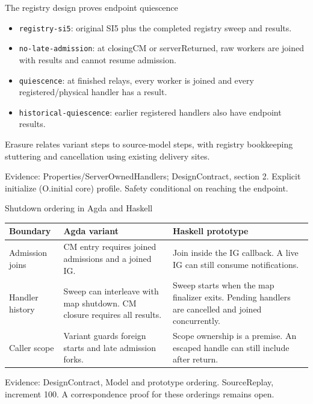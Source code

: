 \documentclass[11pt,aspectratio=169]{beamer}
\newcommand{\evidence}[1]{\vfill{\fontsize{7}{8}\selectfont\color{Muted}Evidence: #1\par}}
\begin{document}
\begin{frame}{The registry design proves endpoint quiescence}
\begin{itemize}\setlength\itemsep{2.5mm}
\item \texttt{registry-si5}: original SI5 plus the completed registry sweep and results.
\item \texttt{no-late-admission}: at closingCM or serverReturned, raw workers are joined with results and cannot resume admission.
\item \texttt{quiescence}: at finished relays, every worker is joined and every registered/physical handler has a result.
\item \texttt{historical-quiescence}: earlier registered handlers also have endpoint results.
\end{itemize}\small Erasure relates variant steps to source-model steps, with registry bookkeeping stuttering and cancellation using existing delivery sites.
\evidence{Properties/ServerOwnedHandlers; DesignContract, section 2. Explicit initialize (O.initial core) profile. Safety conditional on reaching the endpoint.}
\end{frame}

\begin{frame}{Shutdown ordering in Agda and Haskell}
\small\renewcommand{\arraystretch}{1.2}
\begin{tabularx}{\textwidth}{@{}P{23mm}YY@{}}
\toprule
Boundary & Agda variant & Haskell prototype \\ \midrule
Admission joins & CM entry requires joined admissions and a joined IG. & Join inside the IG callback. A live IG can still consume notifications. \\[2mm]
Handler history & Sweep can interleave with map shutdown. CM closure requires all results. & Sweep starts when the map finalizer exits. Pending handlers are cancelled and joined concurrently. \\[2mm]
Caller scope & Variant guards foreign starts and late admission forks. & Scope ownership is a premise. An escaped handle can still include after return. \\[2mm]
\bottomrule
\end{tabularx}
\evidence{DesignContract, Model and prototype ordering. SourceReplay, increment 100. A correspondence proof for these orderings remains open.}
\end{frame}
\end{document}
